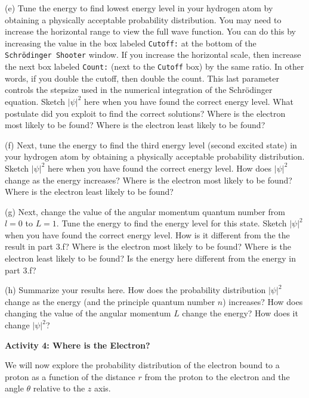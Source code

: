 (e) Tune the energy to find lowest energy level in your hydrogen atom by obtaining
a physically acceptable probability distribution.
You may need to increase the horizontal range to view the full wave function.
You can do this by increasing the value in the box labeled {\tt Cutoff:} at the
bottom of the {\tt Schr\"odinger Shooter} window.
If you increase the horizontal scale, then increase the next box labeled
{\tt Count:} (next to the {\tt Cutoff} box) by the same ratio.
In other words, if you double the cutoff, then double the count.
This last parameter controls the stepsize used in the numerical integration of
the Schr\"odinger equation.
Sketch $|\psi|^2$ here when you have found the correct energy level.
What postulate did you exploit to find the correct solutions?
Where is the electron most likely to be found?
Where is the electron least likely to be found?
\vspace{2.0cm}

\newpage

(f) Next, tune the energy to find the third energy level (second excited state)
in your hydrogen atom by obtaining
a physically acceptable probability distribution.
Sketch $|\psi|^2$ here when you have found the correct energy level.
How does $|\psi|^2$ change as the energy increases?
Where is the electron most likely to be found?
Where is the electron least likely to be found?
\vspace{4.5cm}

(g) Next, change the value of the angular momentum quantum number from $l=0$
to $L=1$.
Tune the energy to find the energy level for this state.
Sketch $|\psi|^2$ when you have found the correct energy level.
How is it different from the the result in part 3.f?
Where is the electron most likely to be found?
Where is the electron least likely to be found?
Is the energy here different from the energy in part 3.f?
\vspace{4.5cm}

(h) Summarize your results here. How does the probability distribution $|\psi|^2$ 
change as the energy (and the principle quantum number $n$) increases?
How does changing the value of the angular momentum $L$ change the energy?
How does it change $|\psi|^2$?
\vspace{4.5cm}

\textbf{Activity 4: Where is the Electron?}

We will now explore the probability distribution of the electron bound to a proton as a function
of the distance $r$ from the proton to the electron and the angle $\theta$ relative to the $z$ axis.

